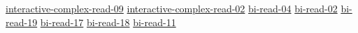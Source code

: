 \hyperref[sec:interactive-complex-read-09]{interactive-complex-read-09}
\hyperref[sec:interactive-complex-read-02]{interactive-complex-read-02}
\hyperref[sec:bi-read-04]{bi-read-04}
\hyperref[sec:bi-read-02]{bi-read-02}
\hyperref[sec:bi-read-19]{bi-read-19}
\hyperref[sec:bi-read-17]{bi-read-17}
\hyperref[sec:bi-read-18]{bi-read-18}
\hyperref[sec:bi-read-11]{bi-read-11}
